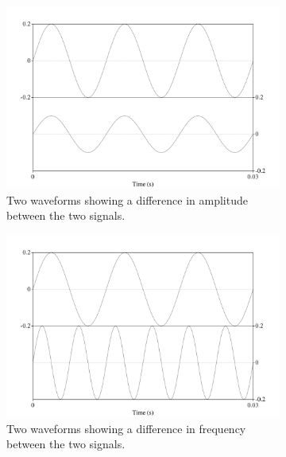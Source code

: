 \begin{figure}[H]
\begin{subfigure}{0.5\textwidth}
  \includegraphics[width=\textwidth]{figure/basic-sound-amplitude.png}
  \caption{Two waveforms showing a difference in amplitude between the two signals.}
  \label{fig:basic-sound-amplitude}
\end{subfigure}
\qquad
\begin{subfigure}{0.5\textwidth}
  \includegraphics[width=\textwidth]{figure/basic-sound-frequency.png}
  \caption{Two waveforms showing a difference in frequency between the two signals.}
  \label{fig:basic-sound-frequency}
\end{subfigure}
%
\\[2ex]
\begin{center}
\begin{subfigure}{0.5\textwidth}

\end{subfigure}
\end{center}
\end{figure}
